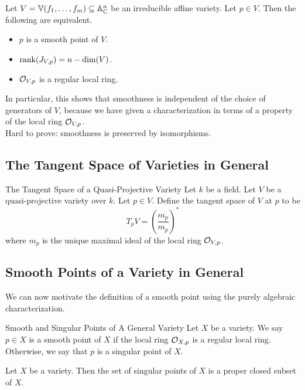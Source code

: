 \documentclass[a4paper]{article}
\begin{document}
\begin{prp}{}{} Let $V=\mathbb{V}(f_1,\dots,f_m)\subseteq\mathbb{A}_{\mathbb{C}}^n$ be an irreducible affine variety. Let $p\in V$. Then the following are equivalent. 
\begin{itemize}
\item $p$ is a smooth point of $V$. 
\item $\rank(J_{V,p})=n-\dim(V)$. 
\item $\mathcal{O}_{V,p}$ is a regular local ring. 
\end{itemize}
\end{prp}

In particular, this shows that smoothness is independent of the choice of generators of $V$, because we have given a characterization in terms of a property of the local ring $\mathcal{O}_{V,p}$. \\

Hard to prove: smoothness is preserved by isomorphisms. 

\subsection{The Tangent Space of Varieties in General}
\begin{defn}{The Tangent Space of a Quasi-Projective Variety}{} Let $k$ be a field. Let $V$ be a quasi-projective variety over $k$. Let $p\in V$. Define the tangent space of $V$ at $p$ to be $$T_pV=\left(\frac{m_p}{m_p}\right)^\ast$$ where $m_p$ is the unique maximal ideal of the local ring $\mathcal{O}_{V,p}$. 
\end{defn}

\subsection{Smooth Points of a Variety in General}
We can now motivate the definition of a smooth point using the purely algebraic characterization. 

\begin{defn}{Smooth and Singular Points of A General Variety}{} Let $X$ be a variety. We say $p\in X$ is a smooth point of $X$ if the local ring $\mathcal{O}_{X,p}$ is a regular local ring. Otherwise, we say that $p$ is a singular point of $X$. 
\end{defn}

\begin{thm}{}{} Let $X$ be a variety. Then the set of singular points of $X$ is a proper closed subset of $X$. 
\end{thm}
\end{document}
